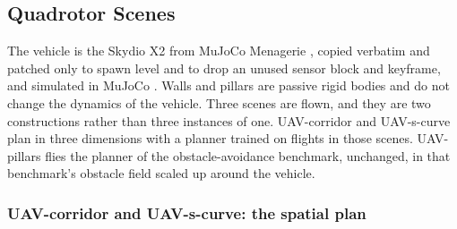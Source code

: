 \subsection{Quadrotor Scenes}\label{sec:method:env:uav}

The vehicle is the Skydio X2 from MuJoCo Menagerie \parencite{zakka2022menagerie}, copied verbatim and
patched only to spawn level and to drop an unused sensor block and keyframe, and simulated in MuJoCo
\parencite{todorov2012mujoco}. Walls and pillars are passive rigid bodies and do not change the dynamics
of the vehicle. Three scenes are flown, and they are two constructions rather than three instances of
one. UAV-corridor and UAV-s-curve plan in three dimensions with a planner trained on flights in those
scenes. UAV-pillars flies the planner of the obstacle-avoidance benchmark, unchanged, in that
benchmark's obstacle field scaled up around the vehicle.

\subsubsection*{UAV-corridor and UAV-s-curve: the spatial plan}

